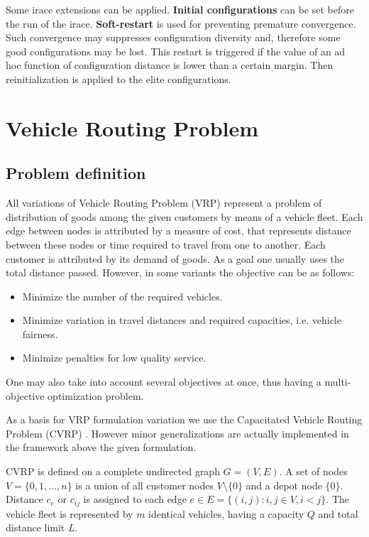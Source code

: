 \documentclass[11pt,a4paper,oneside]{book}
\begin{document}
Some irace extensions can be applied. \textbf{Initial configurations} can be set before the run of the irace. \textbf{Soft-restart} is used for preventing premature convergence. Such convergence may suppresses configuration diversity and, therefore some good configurations may be lost. This restart is triggered if the value of an ad hoc function of configuration distance is lower than a certain margin. Then reinitialization is applied to the elite configurations.


\chapter{Vehicle Routing Problem}


\section{Problem definition}

All variations of Vehicle Routing Problem (VRP) represent a problem of distribution of goods among the given customers by means of a vehicle fleet. Each edge between nodes is attributed by a measure of cost, that represents distance between these nodes or time required to travel from one to another. Each customer is attributed by its demand of goods. As a goal one usually uses the total distance passed. However, in some variants the objective can be as follows:

\begin{itemize}
\item Minimize the number of the required vehicles.
\item Minimize variation in travel distances and required capacities, i.e. vehicle fairness.
\item Minimize penalties for low quality service.
\end{itemize}

One may also take into account several objectives at once, thus having a multi-objective optimization problem.

As a basis for VRP formulation variation we use the Capacitated Vehicle Routing Problem (CVRP) \cite{CORDEAU2007367}. However minor generalizations are actually implemented in the framework above the given formulation. \par

CVRP is defined on a complete undirected graph $G=(V,E)$. A set of nodes $V=\{0,1,...,n\}$ is a union of all customer nodes $V\setminus\{0\}$ and a depot node $\{0\}$. Distance $c_e$ or $c_{ij}$ is assigned to each edge $e \in E = \{(i,j): i,j \in V, i<j\}$. The vehicle fleet is represented by $m$ identical vehicles, having a capacity $Q$ and total distance limit $L$.
\end{document}
